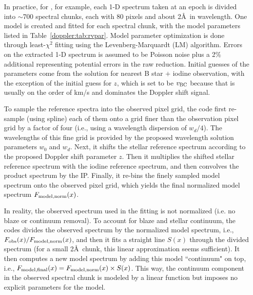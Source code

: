In practice, for \keck, for example, each 1-D spectrum taken at an
epoch is divided into $\sim$700 spectral chunks, each with 80 pixels
and about 2\AA\ in wavelength. One model is created and fitted for
each spectral chunk, with the model parameters listed in
Table~\ref{doppler:tab:rvpar}. Model parameter optimization is done
through least-$\chi^2$ fitting using the Levenberg-Marquardt (LM)
algorithm. Errors on the extracted 1-D spectrum is assumed to be
Poisson noise plus a 2\% additional representing potential errors in
the raw reduction. Initial guesses of the parameters come from the
solution for nearest B star $+$ iodine observation, with the exception
of the initial guess for $z$, which is set to be $v_{\rm BC}$ because
that is usually on the order of km/s and dominates the Doppler shift signal.

To sample the reference spectra into the observed pixel grid, the code
first re-sample (using spline) each of them onto a grid finer than the
observation pixel grid by a factor of four (i.e., using a wavelength
dispersion of $w_d/4$). The wavelengths of this fine grid is provided
by the proposed wavelength solution parameters $w_0$ and $w_d$. Next,
it shifts the stellar reference spectrum according to the proposed
Doppler shift parameter $z$. Then it multiplies the shifted stellar
reference spectrum with the iodine reference spectrum, and then
convolves the product spectrum by the IP. Finally, it re-bins the
finely sampled model spectrum onto the observed pixel grid, which
yields the final normalized model spectrum $F_{\rm model, norm}(x)$.

In reality, the observed spectrum used in the fitting is not
normalized (i.e. no blaze or continuum removal). To account for blaze
and stellar continuum, the codes divides the observed spectrum by the
normalized model spectrum, i.e., $F_{\rm obs}(x)/F_{\rm model,
  norm}(x)$, and then it fits a straight line $S(x)$ through the
divided spectrum (for a small 2\AA\ chunk, this linear approximation
seems sufficient). It then computes a new model spectrum by adding
this model ``continuum" on top, i.e., $F_{\rm model, final}(x) =
F_{\rm model, norm}(x) \times S(x)$. This way, the continuum component
in the observed spectral chunk is modeled by a linear function but
imposes no explicit parameters for the model.




